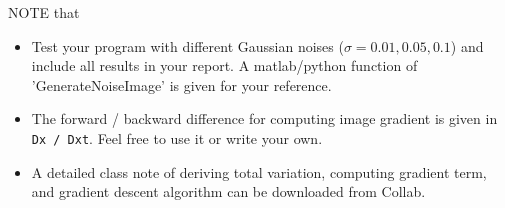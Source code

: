\documentclass[11pt]{article}
\begin{document}
\begin{enumerate}
NOTE that
\begin{itemize}
\item Test your program with different Gaussian noises ($\sigma = 0.01, 0.05, 0.1$) and include all results in your report. A matlab/python function of 'GenerateNoiseImage' is given for your reference. 
\item The forward / backward difference for computing image gradient is given in {\tt Dx / Dxt}. Feel free to use it or write your own. 
\item A detailed class note of deriving total variation, computing gradient term, and gradient descent algorithm can be downloaded from Collab. 
\end{itemize}
\end{enumerate}
\end{document}
